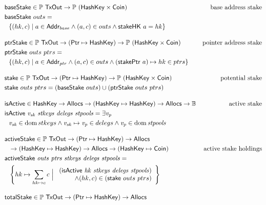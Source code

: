 \begin{figure}[htb]
  \begin{align*}
      & \fun{baseStake} \in \powerset{\TxOut} \to \powerset{(\HashKey \times \Coin)}
      & \text{base address stake} \\
      & \fun{baseStake}~{outs} = \\
      & ~~ \{(hk, c) \mid a\in\Addr_{base} \land (a, c) \in outs \land \fun{stakeHK}~a = hk \}
      \nextdef
      & \fun{ptrStake} \in \powerset{\TxOut} \to (\Ptr \mapsto \HashKey)
          \to \powerset{(\HashKey \times \Coin)}
      & \text{pointer address stake} \\
      & \fun{ptrStake}~{outs}~{ptrs} = \\
      & ~~ \{(hk, c) \mid a\in\Addr_{ptr} \land (a, c) \in outs \land (\fun{stakePtr}~a)\mapsto hk \in ptrs \}
      \nextdef
      & \fun{stake} \in \powerset{\TxOut} \to (\Ptr \mapsto \HashKey)
          \to \powerset{(\HashKey \times \Coin)}
      & \text{potential stake} \\
      & \fun{stake}~{outs}~{ptrs} = (\fun{baseStake}~{outs}) \cup (\fun{ptrStake}~{outs}~{ptrs})
      \nextdef
      & \fun{isActive} \in \HashKey \to \Allocs \to (\HashKey \mapsto \HashKey) \to \Allocs \to \mathbb{B}
      & \text{active stake} \\
      & \isActive{v_{sk}}{stkeys}{delegs}{stpools} = \exists \var{v_{p}}\\
      & ~~ \var{v_{sk}} \in \dom stkeys
              \land \var{v_{sk}}\mapsto\var{v_{p}} \in delegs
              \land \var{v_{p}} \in \dom \var{stpools}
      \nextdef
      & \fun{activeStake} \in \powerset{\TxOut} \to (\Ptr \mapsto \HashKey) \to \Allocs\\
      & ~~\to (\HashKey \mapsto \HashKey) \to \Allocs \to (\HashKey \mapsto \Coin)
      & \text{active stake holdings} \\
      & \activeStake{outs}{ptrs}{stkeys}{delegs}{stpools} = \\
      & ~~ \left\{
             hk\mapsto \sum_{hk\mapsto c}c
             ~\Big\vert~
             \begin{array}{r}
             (\isActive{hk}{stkeys}{delegs}{stpools}) \\
             \land (hk, c) \in (\fun{stake}~{outs}~{ptrs})
             \end{array}
           \right\}
      \nextdef
      & \fun{totalStake} \in \powerset{\TxOut} \to (\Ptr \mapsto \HashKey) \to \Allocs\\

\end{align*}
\end{figure}
